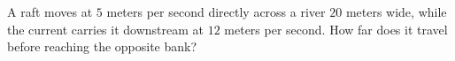 A raft moves at $5$ meters per second directly across a river $20$ meters wide, while the current carries it downstream at $12$ meters per second. How far does it travel before reaching the opposite bank?
